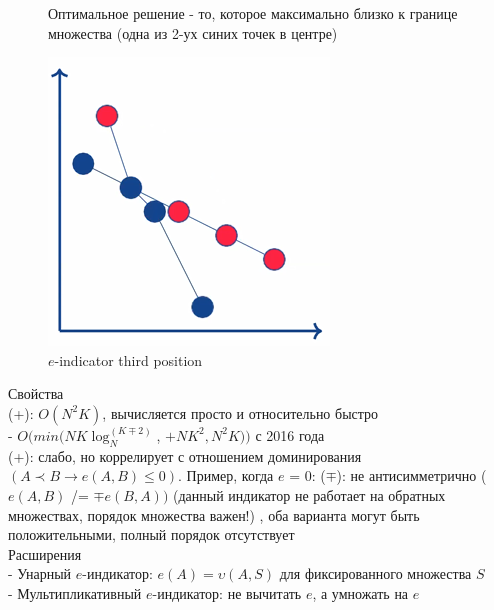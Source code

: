 \begin{figure}[!ht]
Оптимальное решение - то, которое максимально близко к границе множества (одна из 2-ух синих точек в центре)
\begin{center}
    \includegraphics[width=0.3\linewidth]{images/e-indicator2.PNG}
    \caption{$e$-indicator third position}
    \label{fig:mpr}
    
\end{center}

\end{figure}

\newpage

Свойства\\
(+): $O(N^2K)$, вычисляется просто и относительно быстро\\
- $O(min(NK\log_{N}^{(K \mp 2)}$, $+ NK^2, N^2K))$ с 2016 года\\
(+): слабо, но коррелирует с отношением доминирования
$(A \prec B → e(A,B) \leq 0)$. Пример, когда $e$ = 0:
($\mp$): не антисимметрично ($e(A,B)$ /= $\mp e(B,A))$ (данный индикатор не работает на обратных множествах, порядок множества важен!) ,
оба варианта могут быть положительными,
полный порядок отсутствует\\

Расширения\\
- Унарный $e$-индикатор: $e(A) = \upsilon(A,S)$ для фиксированного множества $S$\\
- Мультипликативный $e$-индикатор: не вычитать $e$, а умножать на $e$
